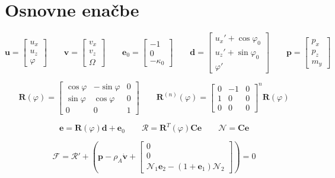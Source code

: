 \documentclass{article}
\newcommand{\dep}[1]{{\scriptstyle(#1)}}
\begin{document}
\section{Osnovne enačbe}
$$\mathbf{u} = 
\begin{bmatrix}
	u_x\\
	u_z\\
	\varphi
\end{bmatrix} \qquad \mathbf{v} = 
\begin{bmatrix}
	v_x\\
	v_z\\
	\Omega
\end{bmatrix} \qquad \mathbf{e}_0=
\begin{bmatrix}
	-1\\
	0\\
	-\kappa_0
\end{bmatrix} \qquad \mathbf{d} = 
\begin{bmatrix}
	u_x' + \cos\varphi_0\\
	u_z' + \sin\varphi_0\\
	\varphi'
\end{bmatrix} \qquad \mathbf{p} = 
\begin{bmatrix}
	p_x\\
	p_z\\
	m_y
\end{bmatrix}
$$


$$\mathbf{R}\dep{\varphi} =
\begin{bmatrix}
	\cos\varphi & -\sin\varphi & 0\\
	\sin\varphi & \cos\varphi & 0\\
	0 & 0 & 1
\end{bmatrix} \qquad \mathbf{R}^{(n)}\dep{\varphi} = 
\begin{bmatrix}
	0 & -1 & 0\\
	1 & 0 & 0\\
	0 & 0 & 0
\end{bmatrix}^n \mathbf{R}\dep{\varphi}
$$


$$\mathbf{e} = \mathbf{R}\dep{\varphi}\mathbf{d}+\mathbf{e}_0 \qquad \mathcal{R} = \mathbf{R}^T\dep{\varphi}\mathbf{Ce} \qquad \mathcal{N} = \mathbf{Ce}$$

$$\mathcal{F} = \mathcal{R}' + (\mathbf{p}-\rho_A \dot{\mathbf{v}} + {\scriptscriptstyle \begin{bmatrix} 0\\ 0\\ \mathcal{N}_1\mathbf{e}_2 - (1+\mathbf{e}_1) \mathcal{N}_2 \end{bmatrix}}) = 0$$
\end{document}
